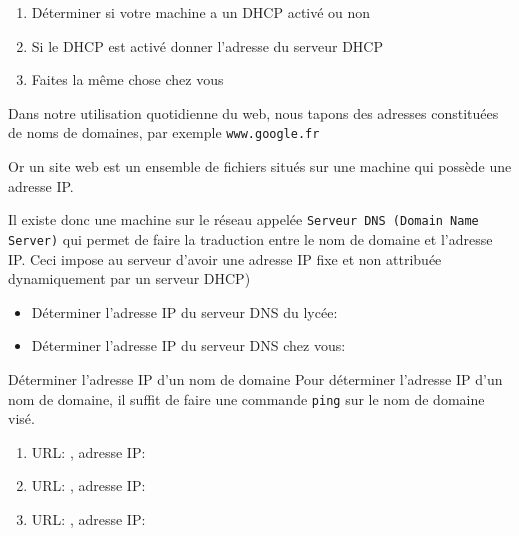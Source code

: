 \begin{exercice_cours}[\quad ]{}
\begin{enumerate}
    \item Déterminer si votre machine a un DHCP activé ou non \dotfill
    \item Si le DHCP est activé donner l'adresse du serveur DHCP \dotfill
    \item Faites la même chose chez vous \dotfill
\end{enumerate}
\end{exercice_cours}

\begin{definition}{}
Dans notre utilisation quotidienne du web, nous tapons des adresses constituées de noms de domaines, par exemple \verb+www.google.fr+   

Or un site web est un ensemble de fichiers situés sur une machine qui possède une adresse IP.

Il existe donc une machine sur le réseau appelée \verb+Serveur DNS (Domain Name Server)+ qui permet de faire la traduction entre le nom de domaine et l'adresse IP. Ceci impose au serveur d'avoir une adresse IP fixe et non attribuée dynamiquement par un serveur DHCP)

\end{definition}

\begin{exercice_cours}{\quad}{}
\begin{itemize}
    \item Déterminer l'adresse IP du serveur DNS du lycée: \dotfill
    \item Déterminer l'adresse IP du serveur DNS chez vous: \dotfill
\end{itemize}
\end{exercice_cours}

\pagebreak

\begin{methode}{Déterminer l'adresse IP d'un nom de domaine}{}
Pour déterminer l'adresse IP d'un nom de domaine, il suffit de faire une commande \verb+ping+ sur le nom de domaine visé.
\end{methode}



\begin{exercice_cours}{}

\begin{enumerate}
    \item URL: \dotfill, adresse IP: \dotfill
    \item URL: \dotfill, adresse IP: \dotfill
    \item URL: \dotfill, adresse IP: \dotfill
\end{enumerate}
\end{exercice_cours}
\medskip


